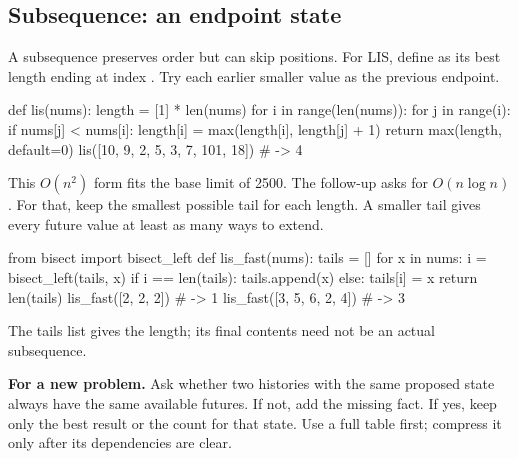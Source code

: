 \documentclass[11pt]{article}
\newcommand{\cd}[1]{{\frenchspacing\texttt{\detokenize{#1}}}}
\newcommand{\transfer}[1]{\par\textbf{For a new problem.} #1\par}
\begin{document}
\subsection{Subsequence: an endpoint state}
A subsequence preserves order but can skip positions. For LIS, define \cd{length[i]} as its best length ending at index \cd{i}.
Try each earlier smaller value as the previous endpoint.
\par\noindent\begin{minipage}{\linewidth}
\hypertarget{example-start-51}{}
\begin{pyex}
def lis(nums):
    length = [1] * len(nums)
    for i in range(len(nums)):
        for j in range(i):
            if nums[j] < nums[i]:
                length[i] = max(length[i], length[j] + 1)
    return max(length, default=0)
lis([10, 9, 2, 5, 3, 7, 101, 18])   # -> 4
\end{pyex}
\hypertarget{example-end-51}{}
\end{minipage}\par
This \(O(n^2)\) form fits the base limit of 2500. The follow-up asks for \(O(n\log n)\).
For that, keep the smallest possible tail for each length. A smaller tail gives every future value at least as many ways to extend.
\par\noindent\begin{minipage}{\linewidth}
\hypertarget{example-start-52}{}
\begin{pyex}
from bisect import bisect_left
def lis_fast(nums):
    tails = []
    for x in nums:
        i = bisect_left(tails, x)
        if i == len(tails):
            tails.append(x)
        else:
            tails[i] = x
    return len(tails)
lis_fast([2, 2, 2])                   # -> 1
lis_fast([3, 5, 6, 2, 4])            # -> 3
\end{pyex}
\hypertarget{example-end-52}{}
\end{minipage}\par
The tails list gives the length; its final contents need not be an actual subsequence.
\transfer{Ask whether two histories with the same proposed state always have the same available futures.
If not, add the missing fact. If yes, keep only the best result or the count for that state.
Use a full table first; compress it only after its dependencies are clear.}
\end{document}
